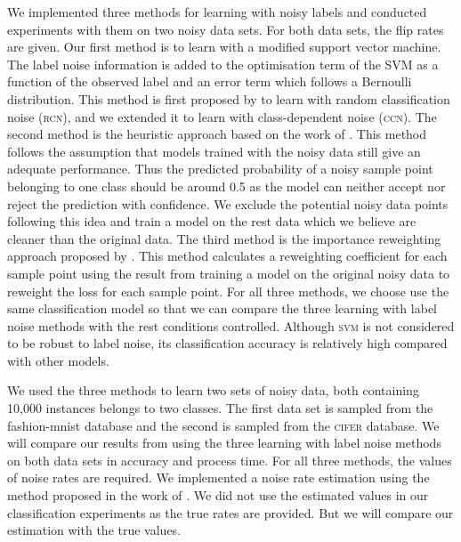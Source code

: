 \documentclass{article} %
\begin{document}
We implemented three methods for learning with noisy labels and conducted experiments with them on two noisy data sets. For both data sets, the flip rates are given. Our first method is to learn with a modified support vector machine. The label noise information is added to the optimisation term of the SVM as a function of the observed label and an error term which follows a Bernoulli distribution. This method is first proposed by \citet{pmlr-v20-biggio11} to learn with random classification noise (\textsc{rcn}), and we extended it to learn with class-dependent noise (\textsc{ccn}). The second method is the heuristic approach based on the work of \citet{Wu03probabilityestimates}. This method follows the assumption that models trained with the noisy data still give an adequate performance. Thus the predicted probability of a noisy sample point belonging to one class should be around 0.5 as the model can neither accept nor reject the prediction with confidence. We exclude the potential noisy data points following this idea and train a model on the rest data which we believe are cleaner than the original data. The third method is the importance reweighting approach proposed by \citet{liu2016classification}. This method calculates a reweighting coefficient for each sample point using the result from training a model on the original noisy data to reweight the loss for each sample point. For all three methods, we choose use the same classification model so that we can compare the three learning with label noise methods with the rest conditions controlled. Although \textsc{svm} is not considered to be robust to label noise, its classification accuracy is relatively high compared with other models.

We used the three methods to learn two sets of noisy data, both containing 10,000 instances belongs to two classes. The first data set is sampled from the fashion-mnist database and the second is sampled from the \textsc{cifer} database. We will compare our results from using the three learning with label noise methods on both data sets in accuracy and process time. For all three methods, the values of noise rates are required. We implemented a noise rate estimation using the method proposed in the work of \citet{liu2016classification}. We did not use the estimated values in our classification experiments as the true rates are provided. But we will compare our estimation with the true values.
\end{document}
